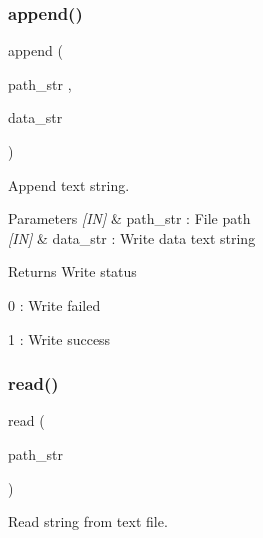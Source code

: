 \subsubsection{append()\hspace{0.1cm}{\footnotesize\ttfamily [2/2]}}
{\footnotesize\ttfamily append (\begin{DoxyParamCaption}\item[{path\+\_\+str}]{,  }\item[{data\+\_\+str}]{ }\end{DoxyParamCaption})}



Append text string. 


\begin{DoxyCode}{0}
\end{DoxyCode}



\begin{DoxyParams}{Parameters}
{\em \mbox{[}\+I\+N\mbox{]}} & path\+\_\+str \+: File path \\
\hline
{\em \mbox{[}\+I\+N\mbox{]}} & data\+\_\+str \+: Write data text string \\
\hline
\end{DoxyParams}
\begin{DoxyReturn}{Returns}
Write status \begin{DoxyItemize}
\item 0 \+: Write failed \item 1 \+: Write success \end{DoxyItemize}

\end{DoxyReturn}
\mbox{\label{classfile_a7ba8178900de6cda9eca9355e366f159}} 
\subsubsection{read()}
{\footnotesize\ttfamily read (\begin{DoxyParamCaption}\item[{path\+\_\+str}]{ }\end{DoxyParamCaption})}



Read string from text file. 


\begin{DoxyCode}{0}
\end{DoxyCode}



